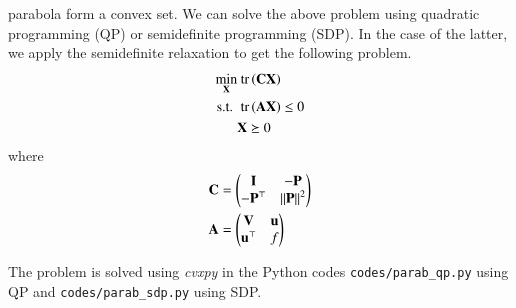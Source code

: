 \documentclass[journal,12pt,twocolumn]{IEEEtran}
\renewcommand{\vec}[1]{\boldsymbol{\mathbf{#1}}}
\begin{document}
\begin{enumerate}
    parabola form a convex set. We can solve the above problem using quadratic
    programming (QP) or semidefinite programming (SDP). In the case of the latter, we
    apply the semidefinite relaxation to get the following problem.
    \begin{align}
        \min_{\vec{X}}&\textrm{ tr}\brak{\vec{CX}} \label{eq:sdp-cost} \\
        \textrm{s.t. }&\textrm{ tr}\brak{\vec{AX}} \le 0 \label{eq:sdp-constr} \\
                      &\vec{X} \succeq 0
    \end{align}
    where
    \begin{align}
        \vec{C} &= \myvec{\vec{I}&-\vec{P}\\-\vec{P}^\top&\norm{\vec{P}}^2} \label{eq:C-def} \\
        \vec{A} &= \myvec{\vec{V}&\vec{u}\\\vec{u}^\top&f} \label{eq:A-def}
    \end{align}

    The problem is solved using \textit{cvxpy} in the Python codes 
    \texttt{codes/parab\_qp.py} using QP and \texttt{codes/parab\_sdp.py}
    using SDP.
\end{enumerate}
\end{document}
